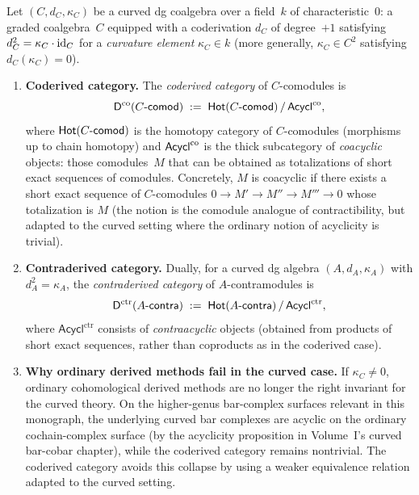\begin{construction}
\label{constr:positselski-framework}
Let $(C, d_C, \kappa_C)$ be a curved dg coalgebra over a field~$k$
of characteristic~$0$: a graded coalgebra~$C$ equipped with a
coderivation $d_C$ of degree~$+1$ satisfying
$d_C^2 = \kappa_C \cdot \mathrm{id}_C$ for a \emph{curvature element}
$\kappa_C \in k$ (more generally,
$\kappa_C \in C^2$ satisfying $d_C(\kappa_C) = 0$).

\begin{enumerate}[label=\textup{(\roman*)}]
\item \textbf{Coderived category.}
The \emph{coderived category} of $C$-comodules is
\begin{equation}\label{eq:coderived-def}
 \mathsf{D}^{\mathrm{co}}(C\text{-}\mathsf{comod})
 \;:=\;
 \mathsf{Hot}(C\text{-}\mathsf{comod}) \,/\, \mathsf{Acycl}^{\mathrm{co}},
\end{equation}
where $\mathsf{Hot}(C\text{-}\mathsf{comod})$ is the homotopy category of
$C$-comodules (morphisms up to chain homotopy) and $\mathsf{Acycl}^{\mathrm{co}}$ is
the thick subcategory of \emph{coacyclic} objects: those comodules~$M$
that can be obtained as totalizations of short exact sequences of
comodules. Concretely, $M$ is coacyclic if there exists a short
exact sequence of $C$-comodules
$0 \to M' \to M'' \to M''' \to 0$
whose totalization is $M$ (the notion is the comodule analogue of
contractibility, but adapted to the curved setting where the
ordinary notion of acyclicity is trivial).

\item \textbf{Contraderived category.}
Dually, for a curved dg algebra $(A, d_A, \kappa_A)$ with
$d_A^2 = \kappa_A$, the \emph{contraderived category} of
$A$-contramodules is
\begin{equation}\label{eq:contraderived-def}
 \mathsf{D}^{\mathrm{ctr}}(A\text{-}\mathsf{contra})
 \;:=\;
 \mathsf{Hot}(A\text{-}\mathsf{contra}) \,/\, \mathsf{Acycl}^{\mathrm{ctr}},
\end{equation}
where $\mathsf{Acycl}^{\mathrm{ctr}}$ consists of
\emph{contraacyclic} objects (obtained from products of short exact
sequences, rather than coproducts as in the coderived case).

\item \textbf{Why ordinary derived methods fail in the curved case.}
If $\kappa_C \neq 0$, ordinary cohomological derived methods are no
longer the right invariant for the curved theory. On the
higher-genus bar-complex surfaces relevant in this monograph, the
underlying curved bar complexes are acyclic on the ordinary
cochain-complex surface \textup{(}by the acyclicity proposition in
Volume~I's curved bar-cobar chapter\textup{)}, while the coderived
category remains nontrivial. The coderived category avoids this
collapse by using a weaker equivalence relation adapted to the
curved setting.
\end{enumerate}
\end{construction}

